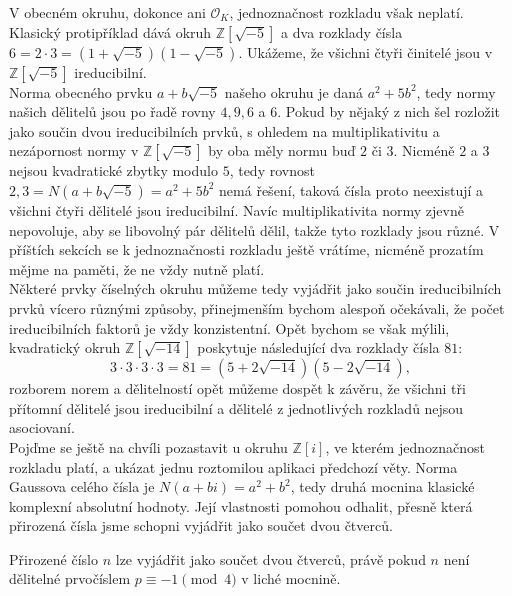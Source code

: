 \documentclass [12pt]{report}
\begin{document}
V obecném okruhu, dokonce ani $\mathcal{O}_K$, jednoznačnost rozkladu však neplatí. Klasický protipříklad dává okruh $\mathbb{Z}[\sqrt{-5}]$ a dva rozklady čísla $6 = 2 \cdot 3 = (1+\sqrt{-5})(1-\sqrt{-5})$. Ukážeme, že všichni čtyři činitelé jsou v $\mathbb{Z}[\sqrt{-5}]$ ireducibilní.\\

Norma obecného prvku $a+b\sqrt{-5}$ našeho okruhu je daná $a^2+5b^2$, tedy normy našich dělitelů jsou po řadě rovny $4,9,6$ a $6$. Pokud by nějaký z nich šel rozložit jako součin dvou ireducibilních prvků, s ohledem na multiplikativitu a nezápornost normy v $\mathbb{Z}[\sqrt{-5}]$ by oba měly normu buď $2$ či $3$. Nicméně $2$ a $3$ nejsou kvadratické zbytky modulo $5$, tedy rovnost $2,3 = N(a+b\sqrt{-5}) = a^2+5b^2$ nemá řešení, taková čísla proto neexistují a všichni čtyři dělitelé jsou ireducibilní. Navíc multiplikativita normy zjevně nepovoluje, aby se libovolný pár dělitelů dělil, takže tyto rozklady jsou různé. V příštích sekcích se k jednoznačnosti rozkladu ještě vrátíme, nicméně prozatím mějme na paměti, že ne vždy nutně platí.\\

Některé prvky číselných okruhu můžeme tedy vyjádřit jako součin ireducibilních prvků vícero různými způsoby, přinejmenším bychom alespoň očekávali, že počet ireducibilních faktorů je vždy konzistentní. Opět bychom se však mýlili, kvadratický okruh $\mathbb{Z}[\sqrt{-14}]$ poskytuje následující dva rozklady čísla $81$:
\begin{equation*}
3 \cdot 3 \cdot 3 \cdot 3 = 81 = (5+2\sqrt{-14})(5-2\sqrt{-14}),
\end{equation*}
rozborem norem a dělitelností opět můžeme dospět k závěru, že všichni tři přítomní dělitelé jsou ireducibilní a dělitelé z jednotlivých rozkladů nejsou asociovaní.\\ 

Pojďme se ještě na chvíli pozastavit u okruhu $\mathbb{Z}[i]$, ve kterém jednoznačnost rozkladu platí, a ukázat jednu roztomilou aplikaci předchozí věty. Norma Gaussova celého čísla je $N(a+bi) = a^2+b^2$, tedy druhá mocnina klasické komplexní absolutní hodnoty. Její vlastnosti pomohou odhalit, přesně která přirozená čísla jsme schopni vyjádřit jako součet dvou čtverců.


\begin{veta} 
Přirozené číslo $n$ lze vyjádřit jako součet dvou čtverců, právě pokud $n$ není dělitelné prvočíslem $p \equiv -1 \pmod{4}$ v liché mocnině.
\end{veta}
\end{document}
